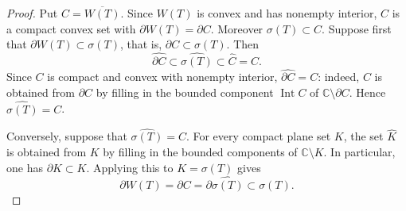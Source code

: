 \documentclass[10pt,a4paper]{amsart}
\newcommand{\CC}{\mathbb{C}}
\begin{document}
\begin{proof}
Put $C=\overline{W(T)}$. Since $W(T)$ is convex and has nonempty
interior, $C$ is a compact convex set with $\partial W(T)=\partial C$.
Moreover $\sigma(T)\subset C$. Suppose first that
$\partial W(T)\subset\sigma(T)$, that is, $\partial C\subset\sigma(T)$.
Then
\[
        \widehat{\partial C}\subset\widehat{\sigma(T)}\subset\widehat C=C .
\]
Since $C$ is compact and convex with nonempty interior,
$\widehat{\partial C}=C$: indeed, $C$ is obtained from $\partial C$ by
filling in the bounded component $\operatorname{Int} C$ of
$\CC\setminus\partial C$. Hence $\widehat{\sigma(T)}=C$.

Conversely, suppose that $\widehat{\sigma(T)}=C$. For every compact plane
set $K$, the set $\widehat K$ is obtained from $K$ by filling in the bounded
components of $\CC\setminus K$.  In particular, one has
$\partial\widehat K\subset K$. Applying this to $K=\sigma(T)$ gives
\[
        \partial W(T)=\partial C=\partial\widehat{\sigma(T)}
        \subset\sigma(T).
\]
\end{proof}
\end{document}
